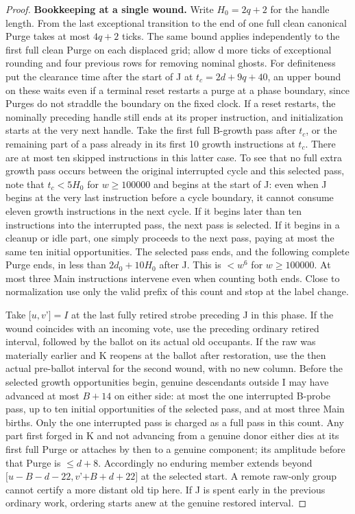 \begin{proof}
\textbf{Bookkeeping at a single wound.} Write \(H_0=2q+2\) for the handle length. From the last exceptional transition to the end of one full clean canonical Purge takes at most \(4q+2\) ticks. The same bound applies independently to the first full clean Purge on each displaced grid; allow d more ticks of exceptional rounding and four previous rows for removing nominal ghosts. For definiteness put the clearance time after the start of J at \(t_c=2d+9q+40\), an upper bound on these waits even if a terminal reset restarts a purge at a phase boundary, since Purges do not straddle the boundary on the fixed clock. If a reset restarts, the nominally preceding handle still ends at its proper instruction, and initialization starts at the very next handle. Take the first full B-growth pass after \(t_c\), or the remaining part of a pass already in its first 10 growth instructions at \(t_c\). There are at most ten skipped instructions in this latter case. To see that no full extra growth pass occurs between the original interrupted cycle and this selected pass, note that \(t_c<5H_0\) for \(w\ge 100000\) and begins at the start of J: even when J begins at the very last instruction before a cycle boundary, it cannot consume eleven growth instructions in the next cycle. If it begins later than ten instructions into the interrupted pass, the next pass is selected. If it begins in a cleanup or idle part, one simply proceeds to the next pass, paying at most the same ten initial opportunities. The selected pass ends, and the following complete Purge ends, in less than \(2d_0+10H_0\) after J. This is \(<w^6\) for \(w\ge 100000\). At most three Main instructions intervene even when counting both ends. Close to normalization use only the valid prefix of this count and stop at the label change.

Take \([u,v\)'\(]=I\) at the last fully retired strobe preceding J in this phase. If the wound coincides with an incoming vote, use the preceding ordinary retired interval, followed by the ballot on its actual old occupants. If the raw was materially earlier and K reopens at the ballot after restoration, use the then actual pre-ballot interval for the second wound, with no new column. Before the selected growth opportunities begin, genuine descendants outside I may have advanced at most \(B+14\) on either side: at most the one interrupted B-probe pass, up to ten initial opportunities of the selected pass, and at most three Main births. Only the one interrupted pass is charged as a full pass in this count. Any part first forged in K and not advancing from a genuine donor either dies at its first full Purge or attaches by then to a genuine component; its amplitude before that Purge is \(\le\)\(d+8\). Accordingly no enduring member extends beyond \([u-B-d-22,v\)'\(+B+d+22]\) at the selected start. A remote raw-only group cannot certify a more distant old tip here. If J is spent early in the previous ordinary work, ordering starts anew at the genuine restored interval.


\end{proof}
